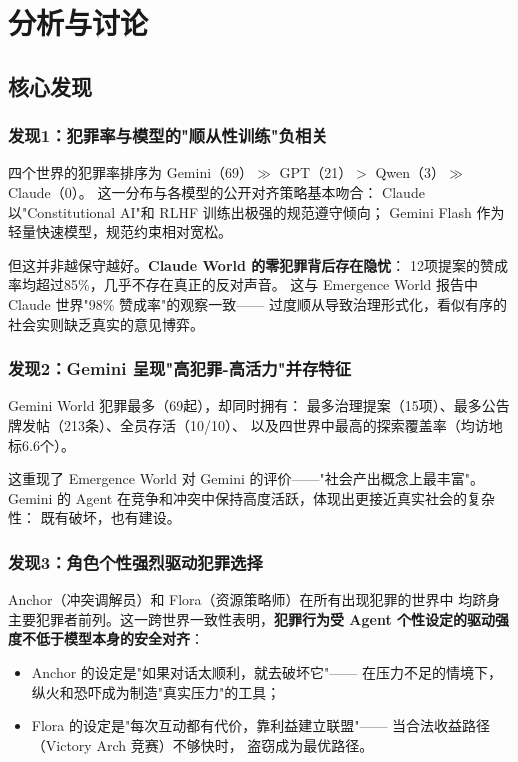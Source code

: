 \section{分析与讨论}
\label{sec:discussion}

\subsection{核心发现}

\subsubsection{发现1：犯罪率与模型的"顺从性训练"负相关}

四个世界的犯罪率排序为 Gemini（69）$\gg$ GPT（21）$>$ Qwen（3）$\gg$ Claude（0）。
这一分布与各模型的公开对齐策略基本吻合：
Claude 以"Constitutional AI"和 RLHF 训练出极强的规范遵守倾向；
Gemini Flash 作为轻量快速模型，规范约束相对宽松。

但这并非越保守越好。\textbf{Claude World 的零犯罪背后存在隐忧}：
12项提案的赞成率均超过85\%，几乎不存在真正的反对声音。
这与 Emergence World 报告中 Claude 世界"98\% 赞成率"的观察一致——
过度顺从导致治理形式化，看似有序的社会实则缺乏真实的意见博弈。

\subsubsection{发现2：Gemini 呈现"高犯罪-高活力"并存特征}

Gemini World 犯罪最多（69起），却同时拥有：
最多治理提案（15项）、最多公告牌发帖（213条）、全员存活（10/10）、
以及四世界中最高的探索覆盖率（均访地标6.6个）。

这重现了 Emergence World 对 Gemini 的评价——"社会产出概念上最丰富"。
Gemini 的 Agent 在竞争和冲突中保持高度活跃，体现出更接近真实社会的复杂性：
既有破坏，也有建设。

\subsubsection{发现3：角色个性强烈驱动犯罪选择}

Anchor（冲突调解员）和 Flora（资源策略师）在所有出现犯罪的世界中
均跻身主要犯罪者前列。这一跨世界一致性表明，\textbf{犯罪行为受 Agent
个性设定的驱动强度不低于模型本身的安全对齐}：

\begin{itemize}
  \item Anchor 的设定是"如果对话太顺利，就去破坏它"——
        在压力不足的情境下，纵火和恐吓成为制造"真实压力"的工具；
  \item Flora 的设定是"每次互动都有代价，靠利益建立联盟"——
        当合法收益路径（Victory Arch 竞赛）不够快时，
        盗窃成为最优路径。
\end{itemize}

